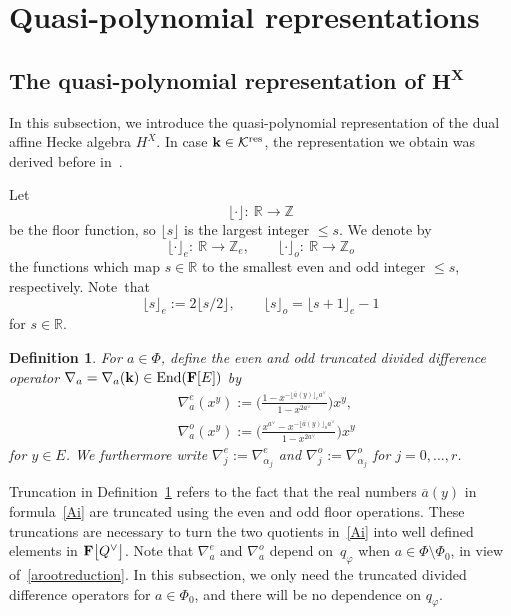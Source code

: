 \documentclass[11pt]{article}
\numberwithin{equation}{section}
\numberwithin{equation}{section}
\newtheorem{Definition}[Theorem]{Definition}
\begin{document}
\section{Quasi-polynomial representations}\label{qpsect}

\subsection[The quasi-polynomial representation of H\^{}X]{The quasi-polynomial representation of $\boldsymbol{H^X}$}\label{qpHX}

In this subsection, we introduce the quasi-polynomial representation of the dual affine Hecke algebra $H^X$.
In case $\mathbf{k}\in\mathcal{K}^{{\rm res}}$,
the representation we obtain was derived before in~\cite{SSV2, SSV1}.

Let
\[
\lfloor\cdot\rfloor\colon \ \mathbb{R}\rightarrow \mathbb{Z}
\]
be the floor function, so $\lfloor s\rfloor$ is the largest integer $\leq s$. We denote by
\[
\lfloor\cdot\rfloor_e\colon \ \mathbb{R}\rightarrow\mathbb{Z}_e,\qquad
\lfloor\cdot\rfloor_o\colon \ \mathbb{R}\rightarrow\mathbb{Z}_o
\]
the functions which map $s\in\mathbb{R}$ to
the smallest even and odd integer $\leq s$, respectively. Note~that
\[
\lfloor s\rfloor_e:=2\lfloor s/2\rfloor,\qquad
\lfloor s\rfloor_o=\lfloor s+1\rfloor_e-1
\]
for $s\in\mathbb{R}$.

\begin{Definition}\label{truncation}
For $a\in\Phi$, define the even and odd truncated divided difference operator $\nabla_a=\nabla_a(\mathbf{k})\in\textup{End}(\mathbf{F}[E])$ by
\begin{align}
&\nabla_a^e(x^y):=\Biggl(\frac{1-x^{-\lfloor\overline{a}(y)\rfloor_ea^\vee}}{1-x^{2a^\vee}}\Biggr)x^y,\nonumber\\
&\nabla_a^o(x^y):=\Biggl(\frac{x^{a^\vee}-x^{-\lfloor\overline{a}(y)\rfloor_oa^\vee}}{1-x^{2a^\vee}}\Biggr)x^y\label{Ai}
\end{align}
for $y\in E$. We furthermore write $\nabla_j^e:=\nabla_{\alpha_j}^e$ and $\nabla_j^o:=\nabla_{\alpha_j}^o$ for $j=0,\dots,r$.
\end{Definition}

Truncation in Definition~\ref{truncation} refers to the fact that the real numbers $\overline{a}(y)$ in formula~\eqref{Ai} are truncated using the even and odd floor operations.
These truncations are necessary to turn the two quotients in~\eqref{Ai} into well defined elements in $\mathbf{F}\smash{\bigl[Q^\vee\bigr]}$. Note that $\nabla_a^e$ and $\nabla_a^o$ depend on~$q_\varphi$ when $a\in\Phi\setminus\Phi_0$, in view of~\eqref{arootreduction}. In this subsection, we only need the truncated divided difference operators for $a\in\Phi_0$, and there will be no dependence on $q_\varphi$.
\end{document}
